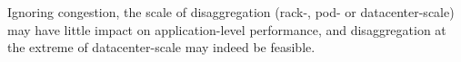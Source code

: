  Ignoring congestion, the scale of disaggregation (rack-, pod- or datacenter-scale) may have little impact on application-level performance, and disaggregation at the extreme of datacenter-scale may indeed be feasible.







%
%

